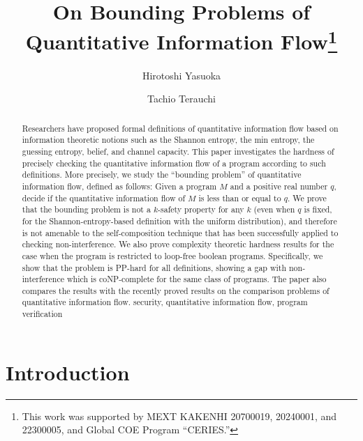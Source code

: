 \documentclass{llncs}
\begin{document}
\title{On Bounding Problems of Quantitative Information
  Flow\thanks{This work was supported by MEXT KAKENHI 20700019,
    20240001, and 22300005, and Global COE Program ``CERIES.''}}
\author{Hirotoshi Yasuoka \and Tachio Terauchi}
\maketitle

\begin{abstract}
Researchers have proposed formal definitions of quantitative
information flow based on information theoretic notions such as the
Shannon entropy, the min entropy, the guessing entropy, belief, and
channel capacity.  This paper investigates the hardness of precisely
checking the quantitative information flow of a program according to
such definitions.  More precisely, we study the ``bounding problem''
of quantitative information flow, defined as follows: Given a program
$M$ and a positive real number $q$, decide if the quantitative
information flow of $M$ is less than or equal to $q$.  We prove that
the bounding problem is not a $k$-safety property for any $k$ (even
when $q$ is fixed, for the Shannon-entropy-based definition with the
uniform distribution), and therefore is not amenable to the
self-composition technique that has been successfully applied to
checking non-interference.  We also prove complexity theoretic
hardness results for the case when the program is restricted to
loop-free boolean programs.  Specifically, we show that the problem is
PP-hard for all definitions, showing a gap with non-interference which
is coNP-complete for the same class of programs.  The paper also
compares the results with the recently proved results on the
comparison problems of quantitative information flow.\newline
\newline
{} security, quantitative information flow, program verification

\end{abstract}



\section{Introduction}
\end{document}
